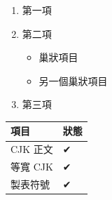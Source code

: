\documentclass[10pt,a4paper]{article}
\begin{document}
\begin{enumerate}
\def\labelenumi{\arabic{enumi}.}
\tightlist
\item
  第一項
\item
  第二項

  \begin{itemize}
  \tightlist
  \item
    巢狀項目
  \item
    另一個巢狀項目
  \end{itemize}
\item
  第三項
\end{enumerate}

{\def\LTcaptype{none} %
\begin{longtable}[]{@{}ll@{}}
\toprule\noalign{}
項目 & 狀態 \\
\midrule\noalign{}
\endhead
\bottomrule\noalign{}
\endlastfoot
CJK 正文 & ✔ \\
等寬 CJK & ✔ \\
製表符號 & ✔ \\
\end{longtable}
}
\end{document}
